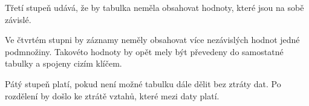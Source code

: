 Třetí stupeň udává, že by tabulka neměla obsahovat hodnoty, které jsou na sobě závislé. 

Ve čtvrtém stupni by záznamy neměly obsahovat více nezávislých hodnot jedné podmnožiny. 
Takovéto hodnoty by opět mely být převedeny do samostatné tabulky a spojeny cizím klíčem.

Pátý stupeň platí, pokud není možné tabulku dále dělit bez ztráty dat. Po 
rozdělení by došlo ke ztrátě vztahů, které mezi daty platí.



\textbf{}
\textit{}



















